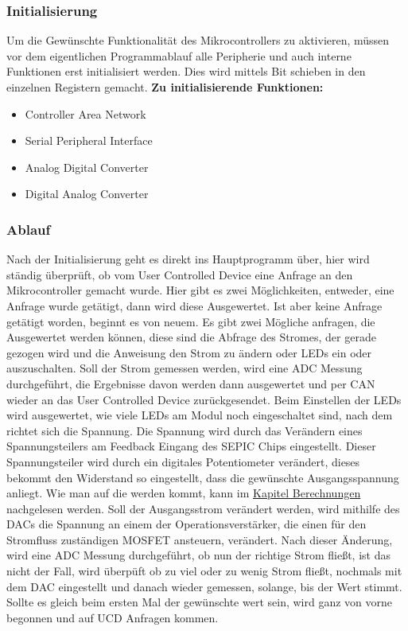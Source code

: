 \documentclass[paper=a4, 12pt]{scrreprt}
\begin{document}
		\subsubsection{Initialisierung}\hfill \break
		Um die Gewünschte Funktionalität des Mikrocontrollers zu aktivieren, müssen vor dem eigentlichen Programmablauf alle Peripherie und auch interne Funktionen erst initialisiert werden. Dies wird mittels Bit schieben in den einzelnen Registern gemacht. \hfill \break \hfill \break		
		\textbf{Zu initialisierende Funktionen:}
		\begin{itemize}
			\item Controller Area Network
			\item Serial Peripheral Interface
			\item Analog Digital Converter
			\item Digital Analog Converter
		\end{itemize}
	
		\subsubsection{Ablauf}\hfill \break
		Nach der Initialisierung geht es direkt ins Hauptprogramm über, hier wird ständig überprüft, ob vom User Controlled Device eine Anfrage an den Mikrocontroller gemacht wurde. Hier gibt es zwei Möglichkeiten, entweder, eine Anfrage wurde getätigt, dann wird diese Ausgewertet. Ist aber keine Anfrage getätigt worden, beginnt es von neuem.\hfill \break \hfill \break
		Es gibt zwei Mögliche anfragen, die Ausgewertet werden können, diese sind die Abfrage des Stromes, der gerade gezogen wird und die Anweisung den Strom zu ändern oder LEDs ein oder auszuschalten.\hfill \break \hfill \break
		Soll der Strom gemessen werden, wird eine ADC Messung durchgeführt, die Ergebnisse davon werden dann ausgewertet und per CAN wieder an das User Controlled Device zurückgesendet.\hfill \break \hfill \break
		Beim Einstellen der LEDs wird ausgewertet, wie viele LEDs am Modul noch eingeschaltet sind, nach dem richtet sich die Spannung. Die Spannung wird durch das Verändern eines Spannungsteilers am Feedback Eingang des SEPIC Chips eingestellt. Dieser Spannungsteiler wird durch ein digitales Potentiometer verändert, dieses bekommt den Widerstand so eingestellt, dass die gewünschte Ausgangsspannung anliegt. Wie man auf die werden kommt, kann im \hyperref[sec:berechnungen]{Kapitel Berechnungen} nachgelesen werden.\hfill \break \hfill \break
		Soll der Ausgangsstrom verändert werden, wird mithilfe des DACs die Spannung an einem der Operationsverstärker, die einen für den Stromfluss zuständigen MOSFET ansteuern, verändert. Nach dieser Änderung, wird eine ADC Messung durchgeführt, ob nun der richtige Strom fließt, ist das nicht der Fall, wird überpüft ob zu viel oder zu wenig Strom fließt, nochmals mit dem DAC eingestellt und danach wieder gemessen, solange, bis der Wert stimmt. Sollte es gleich beim ersten Mal der gewünschte wert sein, wird ganz von vorne begonnen und auf UCD Anfragen kommen.
		\newpage
		
\end{document}
